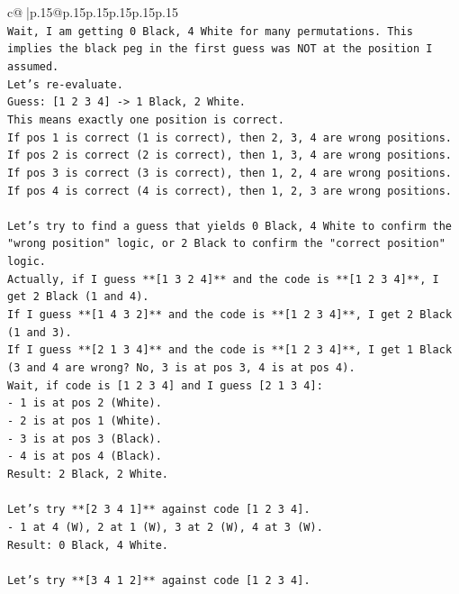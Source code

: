 \documentclass{article}
\begin{document}
{\begin{supertabular}{c@{$\;$}|p{.15\linewidth}@{}p{.15\linewidth}p{.15\linewidth}p{.15\linewidth}p{.15\linewidth}p{.15\linewidth}}
{{{\\ 
\texttt{Wait, I am getting 0 Black, 4 White for many permutations. This implies the black peg in the first guess was NOT at the position I assumed.} \\
\texttt{Let's re{-}evaluate.} \\
\texttt{Guess: {[}1 2 3 4{]} {-}> 1 Black, 2 White.} \\
\texttt{This means exactly one position is correct.} \\
\texttt{If pos 1 is correct (1 is correct), then 2, 3, 4 are wrong positions.} \\
\texttt{If pos 2 is correct (2 is correct), then 1, 3, 4 are wrong positions.} \\
\texttt{If pos 3 is correct (3 is correct), then 1, 2, 4 are wrong positions.} \\
\texttt{If pos 4 is correct (4 is correct), then 1, 2, 3 are wrong positions.} \\
\\ 
\texttt{Let's try to find a guess that yields 0 Black, 4 White to confirm the "wrong position" logic, or 2 Black to confirm the "correct position" logic.} \\
\texttt{Actually, if I guess **{[}1 3 2 4{]}** and the code is **{[}1 2 3 4{]}**, I get 2 Black (1 and 4).} \\
\texttt{If I guess **{[}1 4 3 2{]}** and the code is **{[}1 2 3 4{]}**, I get 2 Black (1 and 3).} \\
\texttt{If I guess **{[}2 1 3 4{]}** and the code is **{[}1 2 3 4{]}**, I get 1 Black (3 and 4 are wrong? No, 3 is at pos 3, 4 is at pos 4).} \\
\texttt{Wait, if code is {[}1 2 3 4{]} and I guess {[}2 1 3 4{]}:} \\
\texttt{{-} 1 is at pos 2 (White).} \\
\texttt{{-} 2 is at pos 1 (White).} \\
\texttt{{-} 3 is at pos 3 (Black).} \\
\texttt{{-} 4 is at pos 4 (Black).} \\
\texttt{Result: 2 Black, 2 White.} \\
\\ 
\texttt{Let's try **{[}2 3 4 1{]}** against code {[}1 2 3 4{]}.} \\
\texttt{{-} 1 at 4 (W), 2 at 1 (W), 3 at 2 (W), 4 at 3 (W).} \\
\texttt{Result: 0 Black, 4 White.} \\
\\ 
\texttt{Let's try **{[}3 4 1 2{]}** against code {[}1 2 3 4{]}.} \\
}}}
\end{supertabular}}
\end{document}
